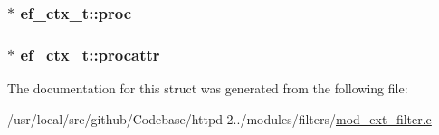 \subsubsection[{\texorpdfstring{proc}{proc}}]{$\ast$ ef\+\_\+ctx\+\_\+t\+::proc}\hypertarget{structef__ctx__t_a83e4c77001d97a46b11660774be7a720}{}\label{structef__ctx__t_a83e4c77001d97a46b11660774be7a720}
\subsubsection[{\texorpdfstring{procattr}{procattr}}]{$\ast$ ef\+\_\+ctx\+\_\+t\+::procattr}\hypertarget{structef__ctx__t_a580e2590db576ae34318ab60518b3a7d}{}\label{structef__ctx__t_a580e2590db576ae34318ab60518b3a7d}


The documentation for this struct was generated from the following file\+:\begin{DoxyCompactItemize}
\item 
/usr/local/src/github/\+Codebase/httpd-\/2../modules/filters/\hyperlink{mod__ext__filter_8c}{mod\+\_\+ext\+\_\+filter.\+c}\end{DoxyCompactItemize}
